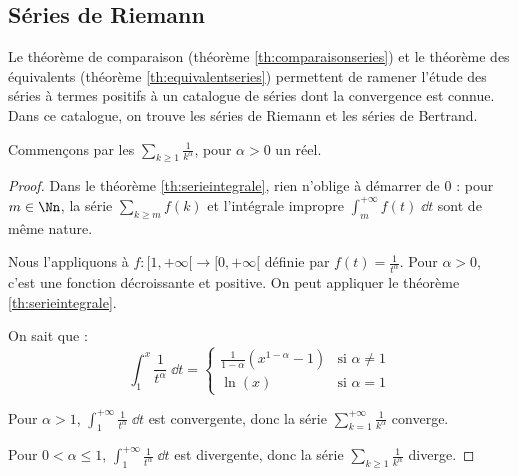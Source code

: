 \documentclass[class=report,crop=false]{standalone}
\begin{document}
\subsection{Séries de Riemann}


Le théorème de comparaison (théorème \ref{th:comparaisonseries}) et
le théorème des équivalents (théorème \ref{th:equivalentseries}) 
permettent de ramener l'étude des séries à termes positifs à un catalogue de séries 
dont la convergence est connue. Dans ce catalogue, on trouve les séries de Riemann 
et les séries de Bertrand.


Commençons par les  $\sum_{k\ge 1} \frac{1}{k^\alpha}$, pour $\alpha>0$
un réel.

\begin{proposition}
\end{proposition}

\begin{proof}
Dans le théorème \ref{th:serieintegrale}, rien n'oblige à démarrer de $0$ : pour $m\in\Nn$,
la série $\sum_{k \ge m} f(k)$ 
et l'intégrale impropre $\int_m^{+\infty} f(t) \;\dd t$ sont de même nature.

Nous l'appliquons à $f : [1,+\infty[ \to [0,+\infty[$ définie par 
$f(t)=\frac{1}{t^\alpha}$. Pour $\alpha >0$, c'est une fonction décroissante et positive.
On peut appliquer le théorème \ref{th:serieintegrale}.

On sait que :
$$
\int_1^{x} \frac{1}{t^\alpha}\;\dd t =
\left\{\begin{array}{ll}
\displaystyle{\frac{1}{1-\alpha}(x^{1-\alpha}-1)}&\mbox{si }\alpha\neq
    1\\[1.5ex]
\ln(x) &\mbox{si }\alpha=1
\end{array}\right. 
$$

Pour $\alpha > 1$, $\int_1^{+\infty} \frac{1}{t^\alpha} \; \dd t $ 
est convergente, donc la série $\sum_{k = 1}^{+\infty} \frac{1}{k^\alpha}$ converge.

Pour $0<\alpha\le 1$, $\int_1^{+\infty} \frac{1}{t^\alpha} \; \dd t $ 
est divergente, donc la série $\sum_{k \ge 1} \frac{1}{k^\alpha}$ diverge.
\end{proof}


\end{document}

